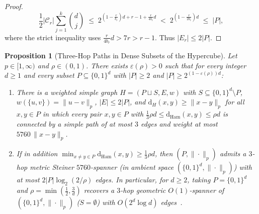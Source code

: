\documentclass[11pt]{article}
\newtheorem{proposition}[theorem]{Proposition}
\theoremstyle{definition}
\theoremstyle{remark}
\newcommand{\dH}{\mathrm{d}_H}
\newcommand{\Ham}{\mathrm{Ham}}
\newcommand{\dHam}{\mathrm{d}_{\Ham}}
\begin{document}
\begin{proof}
\[
\frac{1}{2}|\mathcal{C}_r|\sum_{j=1}^k \binom{d}{j} \;\le\; 2^{(1 - \frac{r}{b_r}) d + r - 1 + \frac{r}{4 b_r} d} \;<\; 2^{(1 - \frac{r}{2 b_r}) d} \;\le\; |P|,
\]
where the strict inequality uses $\frac{r}{4 b_r} d > 7 r > r - 1$. Thus $|E_r| \le 2|P|$.
\end{proof}

\begin{proposition}[Three-Hop Paths in Dense Subsets of the Hypercube]
\label{prop:three-hop}
Let $p \in [1, \infty)$ and $\rho \in (0, 1)$. There exists $\varepsilon(\rho) > 0$ such that for every integer $d \ge 1$ and every subset $P \subseteq \{0, 1\}^d$ with $|P| \ge 2$ and $|P| \ge 2^{(1 - \varepsilon(\rho)) d}$:
\begin{enumerate}[label=(\alph*),nosep]
  \item There is a weighted simple graph $H = (P \sqcup S, E, w)$ with $S \subseteq \{0, 1\}^d \setminus P$, $w(\{u, v\}) = \|u - v\|_p$, $|E| \le 2|P|$, and $\dH(x, y) \ge \|x - y\|_p$ for all $x, y \in P$ in which every pair $x, y \in P$ with $\frac{1}{3}\rho d \le \dHam(x, y) \le \rho d$ is connected by a simple path of at most $3$ edges and weight at most $5760\,\|x - y\|_p$.
  \item If in addition $\min_{x \ne y \in P} \dHam(x, y) \ge \frac{1}{3}\rho d$, then $(P, \|\cdot\|_p)$ admits a $3$-hop metric Steiner $5760$-spanner (in ambient space $(\{0, 1\}^d, \|\cdot\|_p)$) with at most $2|P|\log_2(2/\rho)$ edges. In particular, for $d \ge 2$, taking $P = \{0, 1\}^d$ and $\rho = \min(\frac{1}{2}, \frac{3}{d})$ recovers a $3$-hop geometric $O(1)$-spanner of $(\{0, 1\}^d, \|\cdot\|_p)$ ($S = \emptyset$) with $O(2^d \log d)$ edges~\cite[Theorem~A.1]{krauthgamer2026towards}.
\end{enumerate}
\end{proposition}
\end{document}
